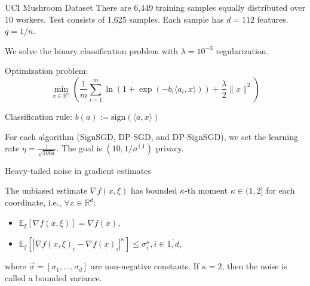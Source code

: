 \documentclass{beamer}
\newcommand{\EE}{\mathbb{E}}
\newcommand{\R}{\mathbb{R}}
\begin{document}
\begin{frame}{UCI Mushroom Dataset}
There are 6,449 training samples equally distributed over 10 workers. Test consists of 1,625 samples. Each sample has $d = 112$ features. $q = 1/n$.

We solve the binary classification problem with $\lambda = 10^{-3}$ regularization.

\bigskip

Optimization problem:
$$\min_{x \in \mathbb{R}^n} \left( \frac{1}{m} \sum_{i=1}^m \ln(1 + \exp(-b_i \langle a_i, x \rangle)) + \frac{\lambda}{2} \|x\|^2 \right)
$$

Classification rule:
$b(a) := \text{sign}(\langle a, x \rangle)$

\bigskip

For each algorithm (SignSGD, DP-SGD, and DP-SignSGD), we set the learning rate $\eta=\frac{1}{\sqrt{100 d}}$. The goal is $(10, 1/n^{1.1})$ privacy.
\end{frame}
\begin{frame}{Heavy-tailed noise in gradient estimates}

    The unbiased estimate $\nabla f (x, \xi)$  has bounded $\kappa$-th moment $\kappa \in (1,2]$ for each coordinate, i.e., $\forall x \in \R^d$: 
    \begin{itemize}
        \item $\EE_\xi [\nabla f (x, \xi)] = \nabla f(x),$
        \item $\EE_\xi [|\nabla f (x, \xi)_i - \nabla f(x)_i|^\kappa] \leq \sigma_i^\kappa, i \in \overline{1,d},$
    \end{itemize}
    where $\Vec{\sigma} = [\sigma_1, \dots, \sigma_d]$ are non-negative constants.
    If $\kappa = 2$, then the noise is called a bounded variance. 

\end{frame}
\end{document}
